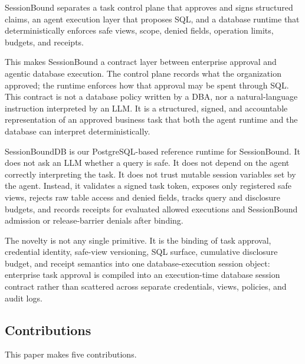 \documentclass[journal]{IEEEtran}
\begin{document}
SessionBound separates a task control plane that approves and signs
structured claims, an agent execution layer that proposes SQL, and a
database runtime that deterministically enforces safe views, scope,
denied fields, operation limits, budgets, and receipts.

This makes SessionBound a contract layer between enterprise approval and
agentic database execution. The control plane records what the
organization approved; the runtime enforces how that approval may be
spent through SQL. This contract is not a database policy written by a
DBA, nor a natural-language instruction interpreted by an LLM. It is a
structured, signed, and accountable representation of an approved
business task that both the agent runtime and the database can interpret
deterministically.

SessionBoundDB is our PostgreSQL-based reference runtime for
SessionBound. It does not ask an LLM whether a query is safe. It does
not depend on the agent correctly interpreting the task. It does not
trust mutable session variables set by the agent. Instead, it validates
a signed task token, exposes only registered safe views, rejects raw
table access and denied fields, tracks query and disclosure budgets, and
records receipts for evaluated allowed executions and SessionBound
admission or release-barrier denials after binding.

The novelty is not any single primitive. It is the binding of task
approval, credential identity, safe-view versioning, SQL surface,
cumulative disclosure budget, and receipt semantics into one
database-execution session object: enterprise task approval is compiled
into an execution-time database session contract rather than scattered
across separate credentials, views, policies, and audit logs.

\hypertarget{contributions}{%
\subsection{Contributions}\label{contributions}}

This paper makes five contributions.
\end{document}
